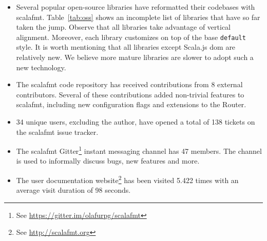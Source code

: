 \begin{itemize}
  \item Several popular open-source libraries have reformatted their codebases with scalafmt.
    Table~\ref{tab:oss} shows an incomplete list of libraries that have so far taken the jump.
    Observe that all libraries take advantage of vertical alignment.
    Moreover, each library customizes on top of the base \texttt{default} style.
    It is worth mentioning that all libraries except Scala.js dom are relatively new.
    We believe more mature libraries are slower to adopt such a new technology.
  \item The scalafmt code repository has received contributions from 8 external contributors.
    Several of these contributions added non-trivial features to scalafmt, including
    new configuration flags and extensions to the Router.
  \item 34 unique users, excluding the author, have opened a total of 138 tickets on the scalafmt issue tracker.
  \item The scalafmt Gitter\footnote{See \url{https://gitter.im/olafurpg/scalafmt}} instant messaging channel has 47 members. The channel is used to informally discuss bugs, new features and more.
  \item The user documentation website\footnote{See \url{http://scalafmt.org}} has been visited 5.422 times with an average visit duration of 98 seconds.
\end{itemize}




